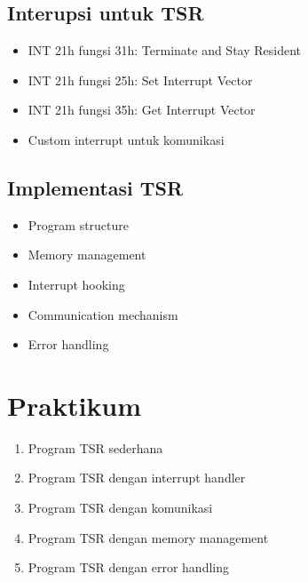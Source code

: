 \subsection{Interupsi untuk TSR}
\begin{itemize}
\item INT 21h fungsi 31h: Terminate and Stay Resident
\item INT 21h fungsi 25h: Set Interrupt Vector
\item INT 21h fungsi 35h: Get Interrupt Vector
\item Custom interrupt untuk komunikasi
\end{itemize}

\subsection{Implementasi TSR}
\begin{itemize}
\item Program structure
\item Memory management
\item Interrupt hooking
\item Communication mechanism
\item Error handling
\end{itemize}

\section{Praktikum}
\begin{enumerate}
\item Program TSR sederhana
\item Program TSR dengan interrupt handler
\item Program TSR dengan komunikasi
\item Program TSR dengan memory management
\item Program TSR dengan error handling
\end{enumerate}

